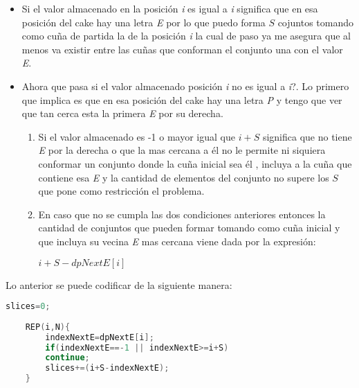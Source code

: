 \begin{itemize}
	\item Si el valor almacenado en la posición \emph{i} es igual a \emph{i} significa que en esa posición del cake hay una letra \emph{E} por lo que puedo forma $S$ cojuntos tomando como cuña de partida la de la posición \emph{i} la cual de paso ya me asegura que al menos va existir entre las cuñas que conforman el conjunto una con el valor \emph{E}.
	
	\item Ahora que pasa si el valor almacenado posición \emph{i} no es igual a \emph{i}?. Lo primero que implica es que en esa posición del cake hay una letra \emph{P} y tengo que ver que tan cerca esta la primera \emph{E} por su derecha. 
	
	\begin{enumerate}
		\item Si el valor almacenado es -1 o mayor igual que $i+S$ significa que no tiene \emph{E} por la derecha o que la mas cercana a él no le permite ni siquiera conformar un conjunto donde la cuña inicial sea él , incluya a la cuña que contiene esa \emph{E} y la cantidad de elementos del conjunto no supere los $S$ que pone como restricción el problema.
		
		\item En caso que no se cumpla las dos condiciones anteriores entonces la cantidad de conjuntos que pueden formar tomando como cuña inicial y que incluya su vecina \emph{E} mas cercana viene dada por la expresión:
		
		$i+S-dpNextE[i]$ 
	\end{enumerate}
\end{itemize}

Lo anterior se puede codificar de la siguiente manera:


\begin{lstlisting}[language=C++]
	slices=0;
	
	REP(i,N){
		indexNextE=dpNextE[i];
		if(indexNextE==-1 || indexNextE>=i+S)
		continue;
		slices+=(i+S-indexNextE);
	}
\end{lstlisting} 